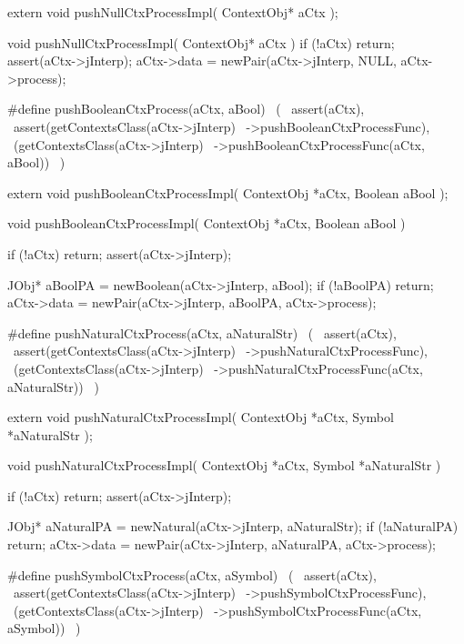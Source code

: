 \startCHeader
extern void pushNullCtxProcessImpl(
  ContextObj* aCtx
);
\stopCHeader
{}

\startCCode
void pushNullCtxProcessImpl(
  ContextObj* aCtx
) {
  if (!aCtx) return;
  assert(aCtx->jInterp);
  aCtx->data = newPair(aCtx->jInterp, NULL, aCtx->process);
}
\stopCCode

\startCHeader
#define pushBooleanCtxProcess(aCtx, aBool)      \
  (                                             \
    assert(aCtx),                               \
    assert(getContextsClass(aCtx->jInterp)      \
      ->pushBooleanCtxProcessFunc),             \
    (getContextsClass(aCtx->jInterp)            \
      ->pushBooleanCtxProcessFunc(aCtx, aBool)) \
  )
\stopCHeader

\setCHeaderStream{private}
\startCHeader
extern void pushBooleanCtxProcessImpl(
  ContextObj *aCtx,
  Boolean     aBool
);
\stopCHeader
\setCHeaderStream{public}

\startCCode
void pushBooleanCtxProcessImpl(
  ContextObj *aCtx,
  Boolean     aBool
) {
  if (!aCtx) return;
  assert(aCtx->jInterp);

  JObj* aBoolPA = newBoolean(aCtx->jInterp, aBool);
  if (!aBoolPA) return;
  aCtx->data = newPair(aCtx->jInterp, aBoolPA, aCtx->process);
}
\stopCCode

\startCHeader
#define pushNaturalCtxProcess(aCtx, aNaturalStr)      \
  (                                                   \
    assert(aCtx),                                     \
    assert(getContextsClass(aCtx->jInterp)            \
      ->pushNaturalCtxProcessFunc),                   \
    (getContextsClass(aCtx->jInterp)                  \
      ->pushNaturalCtxProcessFunc(aCtx, aNaturalStr)) \
  )
\stopCHeader

\startCHeader
extern void pushNaturalCtxProcessImpl(
  ContextObj *aCtx,
  Symbol     *aNaturalStr
);
\stopCHeader
\setCHeaderStream{public}

\startCCode
void pushNaturalCtxProcessImpl(
  ContextObj *aCtx,
  Symbol     *aNaturalStr
) {
  if (!aCtx) return;
  assert(aCtx->jInterp);

  JObj* aNaturalPA = newNatural(aCtx->jInterp, aNaturalStr);
  if (!aNaturalPA) return;
  aCtx->data = newPair(aCtx->jInterp, aNaturalPA, aCtx->process);
}
\stopCCode

\startCHeader
#define pushSymbolCtxProcess(aCtx, aSymbol)      \
  (                                              \
    assert(aCtx),                                \
    assert(getContextsClass(aCtx->jInterp)       \
      ->pushSymbolCtxProcessFunc),               \
    (getContextsClass(aCtx->jInterp)             \
      ->pushSymbolCtxProcessFunc(aCtx, aSymbol)) \
  )
\stopCHeader

